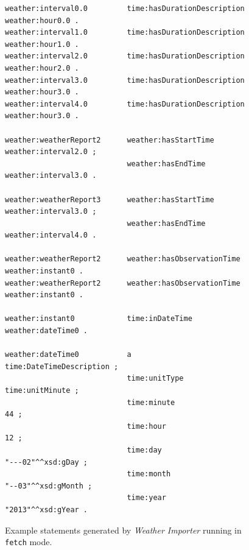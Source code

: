 \begin{figure}
\begin{lstlisting}
weather:interval0.0         time:hasDurationDescription           weather:hour0.0 .
weather:interval1.0         time:hasDurationDescription           weather:hour1.0 .
weather:interval2.0         time:hasDurationDescription           weather:hour2.0 .
weather:interval3.0         time:hasDurationDescription           weather:hour3.0 .
weather:interval4.0         time:hasDurationDescription           weather:hour3.0 .

weather:weatherReport2      weather:hasStartTime                  weather:interval2.0 ;
                            weather:hasEndTime                    weather:interval3.0 .

weather:weatherReport3      weather:hasStartTime                  weather:interval3.0 ;
                            weather:hasEndTime                    weather:interval4.0 .

weather:weatherReport2      weather:hasObservationTime            weather:instant0 .
weather:weatherReport2      weather:hasObservationTime            weather:instant0 .

weather:instant0            time:inDateTime                       weather:dateTime0 .

weather:dateTime0           a                                     time:DateTimeDescription ;
                            time:unitType                         time:unitMinute ;
                            time:minute                           44 ;
                            time:hour                             12 ;
                            time:day                              "---02"^^xsd:gDay ;
                            time:month                            "--03"^^xsd:gMonth ;
                            time:year                             "2013"^^xsd:gYear .
\end{lstlisting}
\caption{Example statements generated by \emph{Weather Importer} running in \texttt{fetch} mode.}
\label{fig:importer_timestamps1}
\end{figure}

